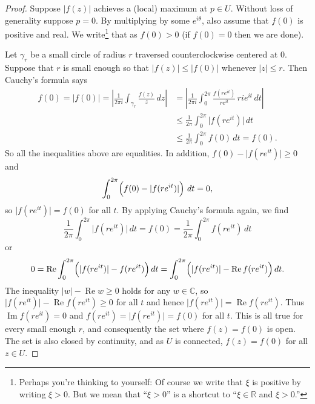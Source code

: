 \documentclass[12pt,openany]{book}
\renewcommand{\Re}{\operatorname{Re}}
\renewcommand{\Im}{\operatorname{Im}}
\newcommand{\sabs}[1]{\lvert {#1} \rvert}
\newcommand{\abs}[1]{\left\lvert {#1} \right\rvert}
\newcommand{\C}{{\mathbb{C}}}
\newcommand{\R}{{\mathbb{R}}}
\theoremstyle{plain}
\theoremstyle{remark}
\theoremstyle{definition}
\theoremstyle{exercise}
\theoremstyle{example}
\begin{document}
\begin{proof}
Suppose $\sabs{f(z)}$ achieves a (local) maximum at $p \in U$.
Without loss of generality suppose $p = 0$.  By multiplying by some
$e^{i\theta}$, also assume that $f(0)$ is positive and real.
We write\footnote{%
Perhaps you're thinking to yourself: Of course we write that $\xi$ is
positive by writing $\xi > 0$.  But we mean that ``$\xi > 0$''
is a shortcut to ``$\xi \in \R$ and $\xi > 0$.''}
that as $f(0) > 0$ (if $f(0) = 0$ then we are done).

Let $\gamma_r$ be a small circle of radius $r$ traversed counterclockwise
centered at $0$.  Suppose that $r$ is small enough so that
$\sabs{f(z)} \leq \sabs{f(0)}$ whenever $\sabs{z} \leq r$.
Then Cauchy's formula says
\begin{equation*}
\begin{split}
f(0) = \sabs{f(0)} =
\abs{\frac{1}{2\pi i}
\int_{\gamma_r}
\frac{f(z)}{z} \, dz
}
& =
\abs{
\frac{1}{2\pi i}
\int_0^{2\pi}
\frac{f(re^{it})}{re^{it}} \, ri e^{it} \, dt
}
\\
& \leq
\frac{1}{2\pi}
\int_0^{2\pi}
\sabs{f(re^{it})}\, dt
\\
&
\leq
\frac{1}{2\pi}
\int_0^{2\pi}
f(0)\, dt = f(0) .
\end{split}
\end{equation*}
So all the inequalities above are equalities.
In addition, $f(0)-\sabs{f(re^{it})} \geq 0$ and
\begin{equation*}
\int_0^{2\pi}\Bigl( f(0)-\sabs{f(re^{it})} \Bigr) \ dt = 0 ,
\end{equation*}
so $\sabs{f(re^{it})} = f(0)$ for all $t$.
By applying Cauchy's formula
again, we find
\begin{equation*}
\frac{1}{2\pi}
\int_0^{2\pi}
\sabs{f(re^{it})}\, dt
=
f(0)
=
\frac{1}{2\pi}
\int_0^{2\pi}
f(re^{it})\, dt
\end{equation*}
or
\begin{equation*}
0 =
\Re \int_0^{2\pi}
\Bigl(\sabs{f(re^{it})}-f(re^{it})\Bigr)\, dt
=
\int_0^{2\pi}
\Bigl(\sabs{f(re^{it})}-\Re f(re^{it})\Bigr)\, dt .
\end{equation*}
The inequality $\sabs{w} - \Re w \geq 0$ holds for any $w \in \C$,
so
$\sabs{f(re^{it})}-\Re f(re^{it}) \geq 0$ for all $t$ and hence
$\sabs{f(re^{it})}=\Re f(re^{it})$.  Thus $\Im f(re^{it}) = 0$
and 
$f(re^{it})=\sabs{f(re^{it})} = f(0)$ for all $t$.
This is all true for every small enough $r$, and consequently the set where
$f(z) = f(0)$ is open.  The set is also closed by continuity, and as $U$ is
connected, $f(z) = f(0)$ for all $z \in U$.
\end{proof}
\end{document}
